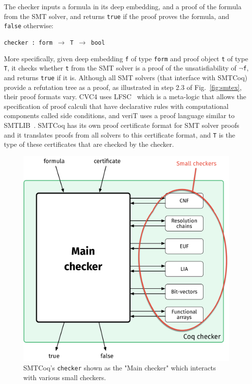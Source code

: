 \documentclass{article}
\begin{document}
	The checker inputs a formula in its 
	deep embedding, and a proof of the 
	formula from the SMT solver, and 
	returns \texttt{true} if the proof 
	proves the formula, and 
	\texttt{false} otherwise:
	\begin{center}
		\texttt{checker : form 
			$\to$ T $\to$ bool}	
	\end{center}
	More specifically, given deep embedding 
	\texttt{f} of type \texttt{form}
	and proof object \texttt{t} of type 
	\texttt{T}, it checks whether \texttt{t} 
	from the SMT solver is a proof of the 
	unsatisfiability of	\texttt{$\neg$f}, and 
	returns \texttt{true} if it is. 
	Although all SMT solvers (that 
	interface with SMTCoq) provide a
	refutation tree as a proof, as 
	illustrated in step 2.3 of 
	Fig.~\ref{fig:smtex},
	their proof formats vary. CVC4 uses 
	LFSC~\cite{DBLP:journals/fmsd/StumpORHT13}
	which is a meta-logic that allows the 
	specification of proof calculi that have 
	declarative	rules with computational 
	components called side conditions, and 
	veriT uses a proof language similar to 
	SMTLIB~\cite{Besson1}. SMTCoq has its 
	own proof certificate format for SMT 
	solver proofs and it translates proofs 
	from all solvers to this certificate 
	format, and \texttt{T} is the type of 
	these certificates that are 
	checked by the checker. 
	
	\begin{figure}[t]
		\begin{center}
			\includegraphics[scale=0.3]{checker}
			\caption{SMTCoq's \texttt{checker}
				shown as the "Main checker" which 
				interacts with various small checkers.}
			\label{fig:checker}
		\end{center}
	\end{figure}
	
\end{document}
